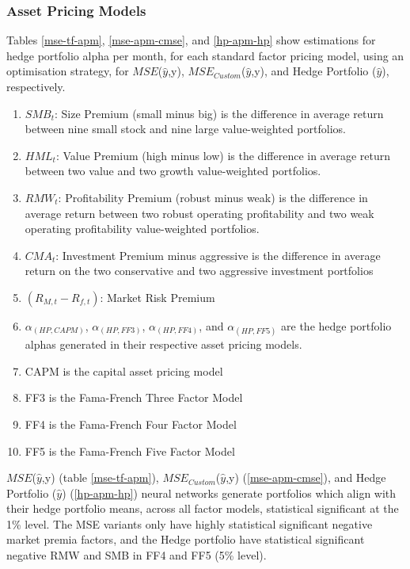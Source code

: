 \documentclass[12pt]{article}
\begin{document}
\subsubsection{Asset Pricing Models}
Tables \ref{mse-tf-apm}, \ref{mse-apm-cmse}, and \ref{hp-apm-hp} show estimations for hedge portfolio alpha per month, for each standard factor pricing model, using an optimisation strategy, 
for $MSE$($\hat{y}$,y), $MSE_{Custom}$($\hat{y}$,y), and Hedge Portfolio ($\hat{y}$), respectively.
\singlespacing
    \begin{enumerate}
    \item $SMB_{t}$: Size Premium (small minus big) is the difference in average return between nine small stock and nine large value-weighted portfolios.
	\item $HML_{t}$: Value Premium (high minus low) is the difference in average return between two value and two growth value-weighted portfolios.
	\item $RMW_{t}$: Profitability Premium (robust minus weak) is the difference in average return between two robust operating profitability and two weak operating profitability value-weighted portfolios.
	\item $CMA_{t}$: Investment Premium minus aggressive is the difference in average return on the two conservative and two aggressive investment portfolios
    \item $(R_{M,t}-R_{f,t})$: Market Risk Premium
    \item $\alpha_{(HP,CAPM)}$, $\alpha_{(HP,FF3)}$, $\alpha_{(HP,FF4)}$, and $\alpha_{(HP,FF5)}$ are the hedge portfolio alphas generated in their respective asset pricing models.
    \item CAPM is the capital asset pricing model
    \item FF3 is the Fama-French Three Factor Model
    \item FF4 is the Fama-French Four Factor Model
    \item FF5 is the Fama-French Five Factor Model
    \end{enumerate}
    \doublespacing
$MSE$($\hat{y}$,y) (table \ref{mse-tf-apm}), $MSE_{Custom}$($\hat{y}$,y) (\ref{mse-apm-cmse}), and Hedge Portfolio ($\hat{y}$) (\ref{hp-apm-hp}) neural networks generate portfolios which align with their hedge portfolio means, across all factor models, statistical significant at the 1\% level.
The MSE variants only have highly statistical significant negative market premia factors, and the Hedge portfolio have statistical significant negative RMW and SMB in FF4 and FF5 (5\% level).
\end{document}
